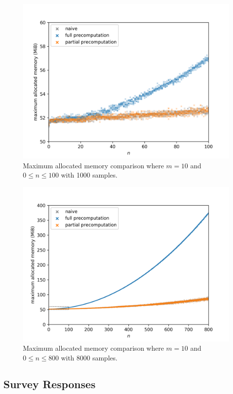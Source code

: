 \begin{figure}[H]
	\centering
	\includegraphics[scale=0.7]{figures/precomputation_memory_small}
	\caption{Maximum allocated memory comparison where $m=10$ and $0\leq n\leq 100$ with 1000 samples.}
\end{figure}

\begin{figure}[H]
	\centering
	\includegraphics[scale=0.7]{figures/precomputation_memory_big}
	\caption{Maximum allocated memory comparison where $m=10$ and $0\leq n\leq 800$ with 8000 samples.}
\end{figure}

\subsection{Survey Responses}

